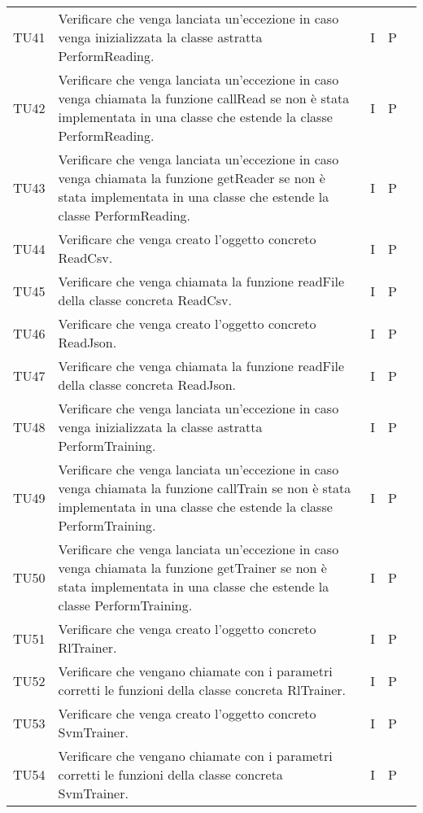 \begin{longtable} {
		>{}p{15mm} 
		>{}p{79.5mm}
		>{}p{15mm} 
		>{}p{15mm}
		>{}p{0mm}}
	TU41		& Verificare che venga lanciata un'eccezione in caso venga inizializzata la classe astratta  PerformReading.& I & P &\TBstrut \\ [2mm]
	TU42		& Verificare che venga lanciata un'eccezione in caso venga chiamata la funzione callRead se non è stata implementata in una classe che estende la classe PerformReading.& I & P &\TBstrut \\ [2mm]
	TU43		& Verificare che venga lanciata un'eccezione in caso venga chiamata la funzione getReader se non è stata implementata in una classe che estende la classe PerformReading.& I & P &\TBstrut \\ [2mm]
	TU44		& Verificare che venga creato l'oggetto concreto ReadCsv.& I & P &\TBstrut \\ [2mm]
	TU45		& Verificare che venga chiamata la funzione readFile della classe concreta ReadCsv.& I & P &\TBstrut \\ [2mm]
	TU46		& Verificare che venga creato l'oggetto concreto ReadJson.& I & P &\TBstrut \\ [2mm]
	TU47		& Verificare che venga chiamata la funzione readFile della classe concreta ReadJson.& I & P &\TBstrut \\ [2mm]
	TU48		& Verificare che venga lanciata un'eccezione in caso venga inizializzata la classe astratta  PerformTraining.& I & P &\TBstrut \\ [2mm]
	TU49		& Verificare che venga lanciata un'eccezione in caso venga chiamata la funzione callTrain se non è stata implementata in una classe che estende la classe PerformTraining.& I & P &\TBstrut \\ [2mm]
	TU50		& Verificare che venga lanciata un'eccezione in caso venga chiamata la funzione getTrainer se non è stata implementata in una classe che estende la classe PerformTraining.& I & P &\TBstrut \\ [2mm]
	TU51		& Verificare che venga creato l'oggetto concreto RlTrainer.& I & P &\TBstrut \\ [2mm]
	TU52		& Verificare che vengano chiamate con i parametri corretti le funzioni della classe concreta RlTrainer.& I & P &\TBstrut \\ [2mm]
	TU53		& Verificare che venga creato l'oggetto concreto SvmTrainer.& I & P &\TBstrut \\ [2mm]
	TU54		& Verificare che vengano chiamate con i parametri corretti le funzioni della classe concreta SvmTrainer.& I & P &\TBstrut \\ [2mm]

\end{longtable}
